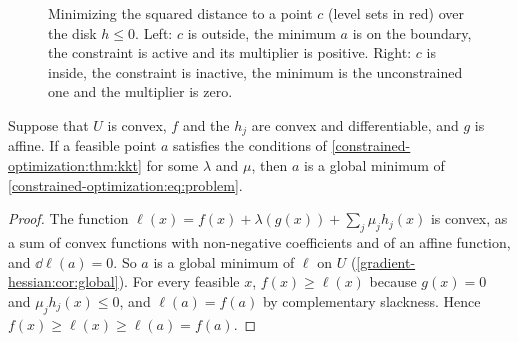 \begin{notechapter}
\begin{figure}[ht]
\centering
{}
\caption{Minimizing the squared distance to a point $c$ (level sets in
red) over the disk $h\leq0$. Left: $c$ is outside, the minimum $a$ is on
the boundary, the constraint is active and its multiplier is positive.
Right: $c$ is inside, the constraint is inactive, the minimum is the
unconstrained one and the multiplier is zero.}
\label{constrained-optimization:fig:kkt}
\end{figure}

\begin{theorem}\label{constrained-optimization:thm:convex}
Suppose that $U$ is convex, $f$ and the $h_j$ are convex and
differentiable, and $g$ is affine. If a feasible point $a$ satisfies the
conditions of \cref{constrained-optimization:thm:kkt} for some $\lambda$
and $\mu$, then $a$ is a global minimum of
\eqref{constrained-optimization:eq:problem}.
\end{theorem}

\begin{proof}
The function
$\ell(x) = f(x) + \lambda(g(x)) + \sum_j\mu_jh_j(x)$ is convex, as a sum
of convex functions with non-negative coefficients and of an affine
function, and $\dd\ell(a) = 0$. So $a$ is a global minimum of $\ell$ on
$U$ (\cref{gradient-hessian:cor:global}). For every feasible $x$,
$f(x)\geq\ell(x)$ because $g(x) = 0$ and $\mu_jh_j(x)\leq0$, and
$\ell(a) = f(a)$ by complementary slackness. Hence
$f(x)\geq\ell(x)\geq\ell(a) = f(a)$.
\end{proof}


\end{notechapter}
